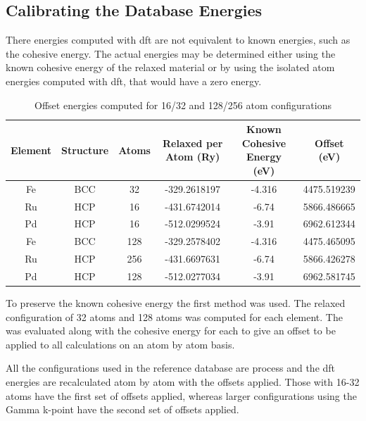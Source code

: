 \subsection{Calibrating the Database Energies}

There energies computed with \acrshort{dft} are not equivalent to known energies, such as the cohesive energy.  The actual energies may be determined either using the known cohesive energy of the relaxed material or by using the isolated atom energies computed with \acrshort{dft}, that would have a zero energy.

\begin{table}[h]
\begin{center}
\begin{tabular}{c c c c c c}
\hline\hline
Element & Structure & Atoms  & Relaxed per Atom (Ry) & Known Cohesive Energy (eV) & Offset (eV)\\
\hline\hline
Fe      & BCC       & 32     & -329.2618197          & -4.316               & 4475.519239  \\
Ru      & HCP       & 16     & -431.6742014          & -6.74                & 5866.486665  \\
Pd      & HCP       & 16     & -512.0299524          & -3.91                & 6962.612344  \\
Fe      & BCC       & 128     & -329.2578402          & -4.316               & 4475.465095  \\
Ru      & HCP       & 256     & -431.6697631          & -6.74                & 5866.426278  \\
Pd      & HCP       & 128     & -512.0277034          & -3.91                & 6962.581745  \\
\hline\hline
\end{tabular}
\end{center}
\caption{Offset energies computed for 16/32 and 128/256 atom configurations}
\label{table:dftoffsetenergies}
\end{table}

To preserve the known cohesive energy the first method was used.  The relaxed configuration of 32 atoms and 128 atoms was computed for each element.  The was evaluated along with the cohesive energy for each to give an offset to be applied to all calculations on an atom by atom basis.

All the configurations used in the reference database are process and the \acrshort{dft} energies are recalculated atom by atom with the offsets applied.  Those with 16-32 atoms have the first set of offsets applied, whereas larger configurations using the Gamma k-point have the second set of offsets applied.


